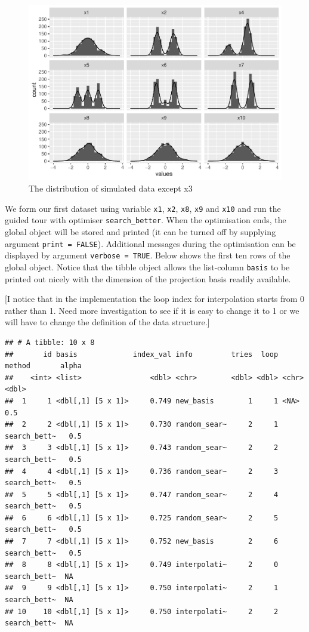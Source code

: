 \documentclass[12pt]{article}
\begin{document}
\begin{figure}
\centering
\includegraphics{paper_files/figure-latex/origin-data-1.pdf}
\caption{\label{origin-data} The distribution of simulated data except
x3}
\end{figure}

We form our first dataset using variable \texttt{x1}, \texttt{x2},
\texttt{x8}, \texttt{x9} and \texttt{x10} and run the guided tour with
optimiser \texttt{search\_better}. When the optimisation ends, the
global object will be stored and printed (it can be turned off by
supplying argument \texttt{print\ =\ FALSE}). Additional messages during
the optimisation can be displayed by argument \texttt{verbose\ =\ TRUE}.
Below shows the first ten rows of the global object. Notice that the
tibble object allows the list-column \texttt{basis} to be printed out
nicely with the dimension of the projection basis readily available.

{[}I notice that in the implementation the loop index for interpolation
starts from 0 rather than 1. Need more investigation to see if it is
easy to change it to 1 or we will have to change the definition of the
data structure.{]}

\newpage

\begin{verbatim}
## # A tibble: 10 x 8
##       id basis             index_val info         tries  loop method       alpha
##    <int> <list>                <dbl> <chr>        <dbl> <dbl> <chr>        <dbl>
##  1     1 <dbl[,1] [5 x 1]>     0.749 new_basis        1     1 <NA>           0.5
##  2     2 <dbl[,1] [5 x 1]>     0.730 random_sear~     2     1 search_bett~   0.5
##  3     3 <dbl[,1] [5 x 1]>     0.743 random_sear~     2     2 search_bett~   0.5
##  4     4 <dbl[,1] [5 x 1]>     0.736 random_sear~     2     3 search_bett~   0.5
##  5     5 <dbl[,1] [5 x 1]>     0.747 random_sear~     2     4 search_bett~   0.5
##  6     6 <dbl[,1] [5 x 1]>     0.725 random_sear~     2     5 search_bett~   0.5
##  7     7 <dbl[,1] [5 x 1]>     0.752 new_basis        2     6 search_bett~   0.5
##  8     8 <dbl[,1] [5 x 1]>     0.749 interpolati~     2     0 search_bett~  NA  
##  9     9 <dbl[,1] [5 x 1]>     0.750 interpolati~     2     1 search_bett~  NA  
## 10    10 <dbl[,1] [5 x 1]>     0.750 interpolati~     2     2 search_bett~  NA
\end{verbatim}
\end{document}
